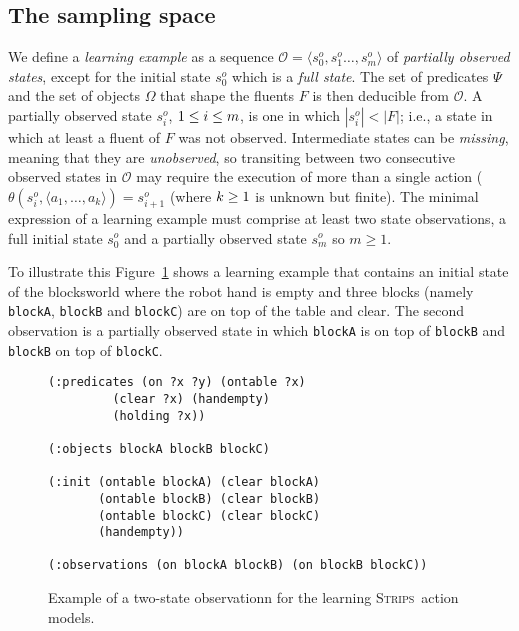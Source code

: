 \documentclass{article}
\newcommand{\tup}[1]{{\langle #1 \rangle}}
\newcommand{\strips}{\textsc{Strips}}
\begin{document}
\subsection{The sampling space}
We define a {\em learning example} as a sequence $\mathcal{O}=\tup{s_0^o,s_1^o \ldots, s_m^o}$ of {\em partially observed states}, except for the initial state $s_0^o$ which is a {\em full state}. The set of predicates $\Psi$ and the set of objects $\Omega$ that shape the fluents $F$ is then deducible from $\mathcal{O}$. A partially observed state $s_i^o$, ${\small 1\leq i\leq m}$, is one in which $|s_i^o| < |F|$; i.e., a state in which at least a fluent of $F$ was not observed. Intermediate states can be {\em missing}, meaning that they are {\em unobserved}, so transiting between two consecutive observed states in $\mathcal{O}$ may require the execution of more than a single action ($\theta(s_i^o,\tup{a_1,\ldots,a_k})=s_{i+1}^o$ (where ${\small k\geq 1}$ is unknown but finite). The minimal expression of a learning example must comprise at least two state observations, a full initial state $s_0^o$ and a partially observed state $s_m^o$ so $m \geq 1$.

To illustrate this Figure~\ref{fig:observation} shows a learning example that contains an initial state of the blocksworld where the robot hand is empty and three blocks (namely {\small\tt blockA}, {\small\tt blockB} and {\small\tt blockC}) are on top of the table and clear. The second observation is a partially observed state in which {\tt blockA} is on top of {\tt blockB} and {\tt blockB} on top of {\tt blockC}.
\begin{figure}[hbt!]
  \begin{tiny}  
  \begin{verbatim}
(:predicates (on ?x ?y) (ontable ?x)
	     (clear ?x) (handempty)
	     (holding ?x))             

(:objects blockA blockB blockC)

(:init (ontable blockA) (clear blockA)
       (ontable blockB) (clear blockB)
       (ontable blockC) (clear blockC)
       (handempty))

(:observations (on blockA blockB) (on blockB blockC))
  \end{verbatim}           
  \end{tiny}
	\caption{\small Example of a two-state observationn for the learning \strips\ action models.}
	\label{fig:observation}
\end{figure}
\end{document}
